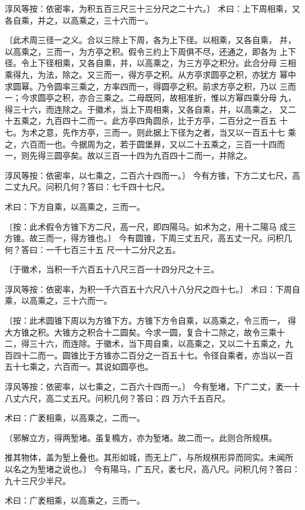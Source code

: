 \documentclass[12pt,UTF8]{ctexbook}
\begin{document}
淳风等按：依密率，为积五百三尺三十三分尺之二十六。〕 术曰：上下周相乘，又各自乘，并之，以高乘之，三十六而一。

〔此术周三径一之义。合以三除上下周，各为上下径。以相乘，又各自乘， 并，以高乘之，三而一，为方亭之积。假令三约上下周俱不尽，还通之，即各为 上下径。令上下径相乘，又各自乘，并，以高乘之，为三方亭之积分。此合分母 三相乘得九，为法，除之。又三而一，得方亭之积。从方亭求圆亭之积，亦犹方 幂中求圆幂。乃令圆率三乘之，方率四而一，得圆亭之积。前求方亭之积，乃以 三而一；今求圆亭之积，亦合三乘之。二母既同，故相准折，惟以方幂四乘分母 九，得三十六，而连除之。于徽术，当上下周相乘，又各自乘，并，以高乘之， 又二十五乘之，九百四十二而一。此方亭四角圆杀，比于方亭，二百分之一百五 十七。为术之意，先作方亭，三而一。则此据上下径为之者，当又以一百五十七 乘之，六百而一也。今据周为之，若于圆堡昪，又以二十五乘之，三百一十四而 一，则先得三圆亭矣。故以三百一十四为九百四十二而一，并除之。

淳风等按：依密率，以七乘之，二百六十四而一。〕 今有方锥，下方二丈七尺，高二丈九尺。问积几何？答曰：七千四十七尺。

术曰：下方自乘，以高乘之，三而一。

〔按：此术假令方锥下方二尺，高一尺，即四陽马。如术为之，用十二陽马 成三方锥。故三而一，得方锥也。〕 今有圆锥，下周三丈五尺，高五丈一尺。问积几何？答曰：一千七百三十五 尺一十二分尺之五。

〔于徽术，当积一千六百五十八尺三百一十四分尺之十三。

淳风等按：依密率，为积一千六百五十六尺八十八分尺之四十七。〕 术曰：下周自乘，以高乘之，三十六而一。

〔按：此术圆锥下周以为方锥下方。方锥下方令自乘，以高乘之，令三而一， 得大方锥之积。大锥方之积合十二圆矣。今求一圆，复合十二除之，故令三乘十 二，得三十六，而连除。于徽术，当下周自乘，以高乘之，又以二十五乘之，九 百四十二而一。圆锥比于方锥亦二百分之一百五十七。令径自乘者，亦当以一百 五十七乘之，六百而一。其说如圆亭也。

淳风等按：依密率，以七乘之，二百六十四而一。〕 今有堑堵，下广二丈，袤一十八丈六尺，高二丈五尺。问积几何？答曰：四 万六千五百尺。

术曰：广袤相乘，以高乘之，二而一。

〔邪解立方，得两堑堵。虽复橢方，亦为堑堵。故二而一。此则合所规棋。

推其物体，盖为堑上叠也。其形如城，而无上广，与所规棋形异而同实。未闻所 以名之为堑堵之说也。〕 今有陽马，广五尺，袤七尺，高八尺。问积几何？答曰：九十三尺少半尺。

术曰：广袤相乘，以高乘之，三而一。
\end{document}
